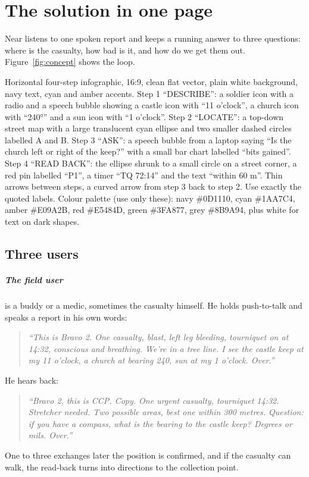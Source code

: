 \chapter{The solution in one page}\label{ch:solution}

Near listens to one spoken report and keeps a running answer to three questions: where is the
casualty, how bad is it, and how do we get them out. Figure~\ref{fig:concept} shows the loop.

{Horizontal four-step infographic, 16:9, clean flat vector, plain white background, navy text, cyan and amber accents.
Step 1 ``DESCRIBE'': a soldier icon with a radio and a speech bubble showing a castle icon with ``11 o'clock'',
a church icon with ``240°'' and a sun icon with ``1 o'clock''. Step 2 ``LOCATE'': a top-down street map with a
large translucent cyan ellipse and two smaller dashed circles labelled A and B. Step 3 ``ASK'': a speech bubble
from a laptop saying ``Is the church left or right of the keep?'' with a small bar chart labelled ``bits gained''.
Step 4 ``READ BACK'': the ellipse shrunk to a small circle on a street corner, a red pin labelled ``P1'', a timer
``TQ 72:14'' and the text ``within 60 m''. Thin arrows between steps, a curved arrow from step 3 back to step 2.
Use exactly the quoted labels. Colour palette (use only these): navy \#0D1110, cyan \#1AA7C4, amber \#E09A2B, red \#E5484D, green \#3FA877, grey \#8B9A94, plus white for text on dark shapes.}

\section{Three users}

\paragraph{The field user} is a buddy or a medic, sometimes the casualty himself. He holds push-to-talk
and speaks a report in his own words:
\begin{quote}\itshape
``This is Bravo 2. One casualty, blast, left leg bleeding, tourniquet on at 14:32, conscious and
breathing. We're in a tree line. I see the castle keep at my 11 o'clock, a church at bearing 240,
sun at my 1 o'clock. Over.''
\end{quote}
He hears back:
\begin{quote}\itshape
``Bravo 2, this is CCP. Copy. One urgent casualty, tourniquet 14:32. Stretcher needed. Two possible
areas, best one within 300 metres. Question: if you have a compass, what is the bearing to the
castle keep? Degrees or mils. Over.''
\end{quote}
One to three exchanges later the position is confirmed, and if the casualty can walk, the read-back
turns into directions to the collection point.

